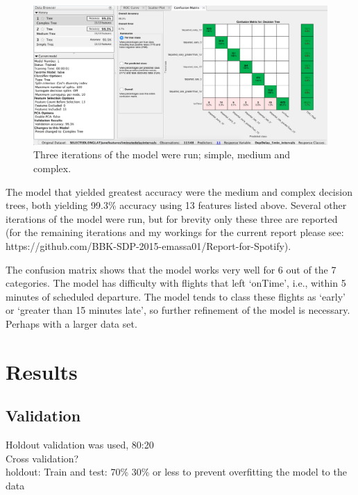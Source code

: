 \documentclass[a4paper, 10pt]{article}
\begin{document}
\begin{figure}[H]
\begin{center}
\includegraphics[scale=0.3]{3models}
\caption{Three iterations of the model were run; simple, medium and complex.}
\label{3models}
\end{center}
\end{figure}


The model that yielded greatest accuracy were the medium and complex decision trees, both yielding 99.3\% accuracy using 13 features listed above. Several other iterations of the model were run, but for brevity only these three are reported (for the remaining iterations and my workings for the current report please see: https://github.com/BBK-SDP-2015-emassa01/Report-for-Spotify).

\vspace{5mm}
The confusion matrix shows that the model works very well for 6 out of the 7 categories. The model has difficulty with flights that left `onTime', i.e., within 5 minutes of scheduled departure. The model tends to class these flights as `early' or `greater than 15 minutes late', so further refinement of the model is necessary. Perhaps with a larger data set.

\section{Results}

\subsection{Validation}
Holdout validation was used, 80:20\\
Cross validation?\\
holdout: Train and test: 70\% 30\% or less to prevent overfitting the model to the data\\
\end{document}
